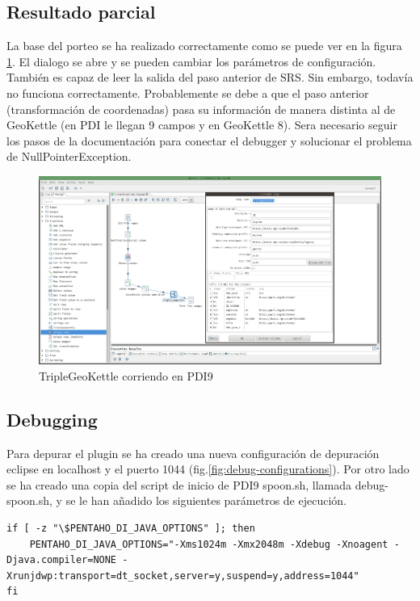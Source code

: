 \subsection{Resultado parcial}

La base del porteo se ha realizado correctamente como se puede ver en la figura \ref{fig:TGK-portado}. El dialogo
se abre y se pueden cambiar los parámetros de configuración. También es capaz de leer la salida del paso anterior
de SRS. Sin embargo, todavía no funciona correctamente. Probablemente se debe a que el paso
anterior (transformación de coordenadas) pasa su información de manera distinta al de GeoKettle (en PDI le llegan
9 campos y en GeoKettle 8). Sera necesario seguir los pasos de la documentación para conectar el debugger y solucionar el
problema de NullPointerException.

\begin{figure}[H]
    \includegraphics[width=\textwidth]{images/TGK-portado.png}
    \centering
    \caption{TripleGeoKettle corriendo en PDI9}
    \label{fig:TGK-portado}
\end{figure}


\subsection{Debugging}

Para depurar el plugin se ha creado una nueva configuración de depuración eclipse en localhost y el puerto 1044
(fig.\ref{fig:debug-configurations}). Por otro lado se ha creado una copia del script de inicio de PDI9 spoon.sh,
llamada debug-spoon.sh, y se le han añadido los siguientes parámetros de ejecución.

\newpage
\begin{lstlisting}
if [ -z "\$PENTAHO_DI_JAVA_OPTIONS" ]; then
    PENTAHO_DI_JAVA_OPTIONS="-Xms1024m -Xmx2048m -Xdebug -Xnoagent -Djava.compiler=NONE -Xrunjdwp:transport=dt_socket,server=y,suspend=y,address=1044"
fi
\end{lstlisting}

